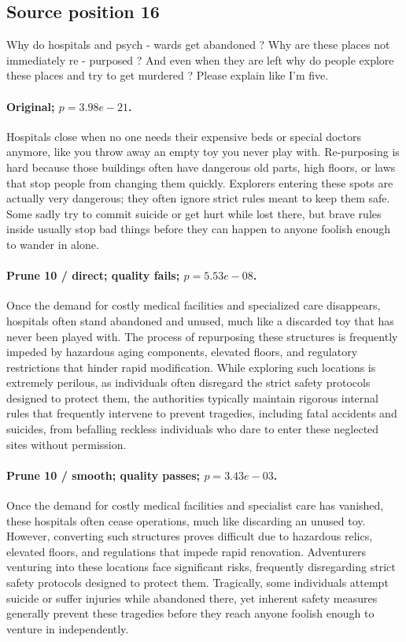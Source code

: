 \subsection*{Source position 16}
Why do hospitals and psych - wards get abandoned ? Why are these places not immediately re - purposed ? And even when they are left why do people explore these places and try to get murdered ? Please explain like I'm five.

\paragraph{Original; $p=3.98e-21$.} Hospitals close when no one needs their expensive beds or special doctors anymore, like you throw away an empty toy you never play with. Re-purposing is hard because those buildings often have dangerous old parts, high floors, or laws that stop people from changing them quickly. Explorers entering these spots are actually very dangerous; they often ignore strict rules meant to keep them safe. Some sadly try to commit suicide or get hurt while lost there, but brave rules inside usually stop bad things before they can happen to anyone foolish enough to wander in alone.


\paragraph{Prune 10 / direct; quality fails; $p=5.53e-08$.} Once the demand for costly medical facilities and specialized care disappears, hospitals often stand abandoned and unused, much like a discarded toy that has never been played with. The process of repurposing these structures is frequently impeded by hazardous aging components, elevated floors, and regulatory restrictions that hinder rapid modification. While exploring such locations is extremely perilous, as individuals often disregard the strict safety protocols designed to protect them, the authorities typically maintain rigorous internal rules that frequently intervene to prevent tragedies, including fatal accidents and suicides, from befalling reckless individuals who dare to enter these neglected sites without permission.

\paragraph{Prune 10 / smooth; quality passes; $p=3.43e-03$.} Once the demand for costly medical facilities and specialist care has vanished, these hospitals often cease operations, much like discarding an unused toy. However, converting such structures proves difficult due to hazardous relics, elevated floors, and regulations that impede rapid renovation. Adventurers venturing into these locations face significant risks, frequently disregarding strict safety protocols designed to protect them. Tragically, some individuals attempt suicide or suffer injuries while abandoned there, yet inherent safety measures generally prevent these tragedies before they reach anyone foolish enough to venture in independently.

